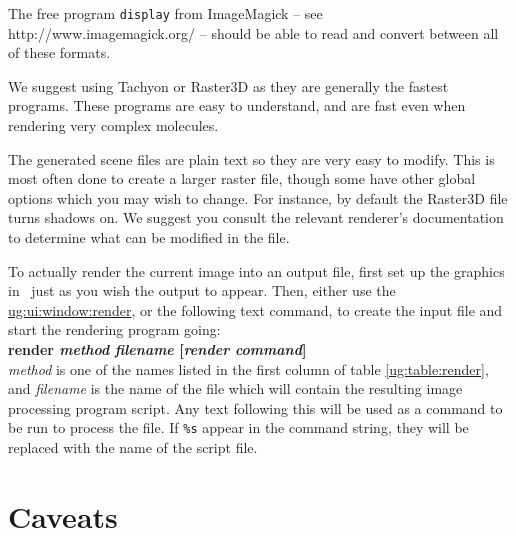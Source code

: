 The free program {\tt display} from ImageMagick -- see   {http://www.imagemagick.org/} -- should be able
to read and convert between all of these formats.

We suggest using Tachyon or Raster3D as they are 
generally the fastest programs.  These programs are easy to 
understand, and are fast even when rendering very complex molecules.

The generated scene files are plain text so they are very easy to modify.  
This is most often done to create a larger raster
file, though some have other global options which you may wish to
change.  For instance, by default the Raster3D file turns shadows on.
We suggest you consult the relevant renderer's documentation to determine 
what can be modified in the file.

To actually render the current image into an output file, first set up
the graphics in \VMD\ just as you wish the output to appear.  Then,
either use the \hyperref{Render window}{Render window 
[\S~}{]}{ug:ui:window:render}, or the following text command, to create
the input file and start the rendering program going:
\vspace{0.1in}
\\
{\bf render {\em method} {\em filename} [{\em render command}]}
\vspace{0.1in}
\\
{\em method} is one of the names listed in the first column of table
\ref{ug:table:render}, and {\em filename} is the name of the file which
will contain the resulting image processing program script.  Any text
following this will be used as a command to be run to process the file.
If {\tt \%s} appear in the command string, they will be replaced with the
name of the script file.

\section{Caveats}

